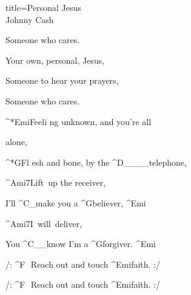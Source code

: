 \begin{song}{title=\predtitle\centering Personal Jesus \\\large Johnny Cash  \vspace*{-0.3cm}}
\begin{centerjustified}
\begin{varwidth}[t]{0.48\textwidth}
	Someone who cares.

	Your own, personal, Jesus,

	Someone to hear your prayers,

	Someone who cares.


\sloka
	^*{Emi}Feeli ng unknown, and you're all 

	alone,

	^*{G}Fl esh and bone, by the ^{D{\color{white}\_\_\_\_}}telephone,

	^{Ami7\z}Lift~up the receiver,

	I'll ^{C{\color{white}\_}}make you a ^{G}believer, ^{Emi}

	^{Ami7\z}I~will~deliver,
	
	You ^{C{\color{white}\_\_}}know I'm a ^{G}forgiver. ^{Emi}


	/: ^{F\sharp\,\,\,\,}Reach out and touch ^{Emi}faith. :/
	
	/: ^{F\sharp\,\,\,\,}Reach out and touch ^{Emi}faith. :/

\end{varwidth}

\end{centerjustified}
\setcounter{Slokočet}{0}
\end{song}	
